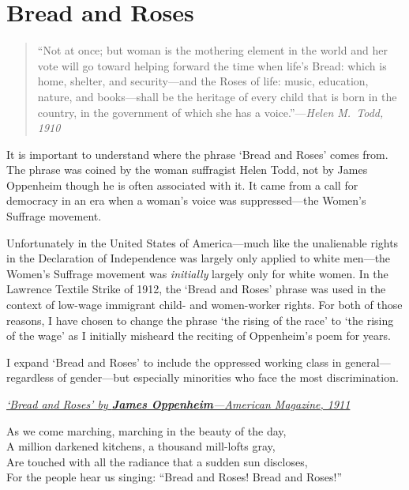\section{Bread and Roses}

\begin{quote}
``Not at once; but woman is the mothering element in the world and her vote will go toward helping forward the time when life's Bread: which is home, shelter, and security---and the Roses of life: music, education, nature, and books---shall be the heritage of every child that is born in the country, in the government of which she has a voice.''---\textit{Helen M.\ Todd, 1910}
\end{quote}

It is important to understand where the phrase `Bread and Roses' comes from. The phrase was coined by the woman suffragist Helen Todd, not by James Oppenheim though he is often associated with it. It came from a call for democracy in an era when a woman's voice was suppressed---the Women's Suffrage movement.

Unfortunately in the United States of America---much like the unalienable rights in the Declaration of Independence was largely only applied to white men---the Women's Suffrage movement was \emph{initially} largely only for white women. In the Lawrence Textile Strike of 1912, the `Bread and Roses' phrase was used in the context of low-wage immigrant child- and women-worker rights. For both of those reasons, I have chosen to change the phrase `the rising of the race' to `the rising of the wage' as I initially misheard the reciting of Oppenheim's poem for years.

I expand `Bread and Roses' to include the oppressed working class in general---regardless of gender---but especially minorities who face the most discrimination.

\bigskip

\noindent\underline{\textit{`Bread and Roses' by \textbf{James Oppenheim}---American Magazine, 1911}}

\bigskip

\noindent As we come marching, marching in the beauty of the day,\\
A million darkened kitchens, a thousand mill-lofts gray,\\
Are touched with all the radiance that a sudden sun discloses,\\
For the people hear us singing: ``Bread and Roses! Bread and Roses!''

\medskip

